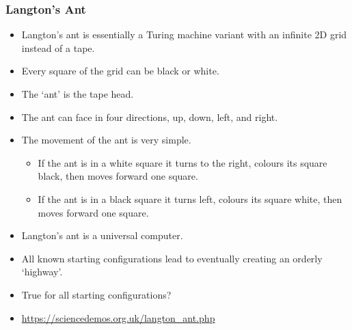 \documentclass[handout]{beamer}
\begin{document}
\begin{frame}
\frametitle{Langton's Ant}
\begin{itemize}
\item Langton's ant is essentially a Turing machine variant with an infinite 2D grid instead of a tape. 
\item Every square of the grid can be black or white. 
\item The `ant' is the tape head. 
\item The ant can face in four directions, up, down, left, and right. 
\item The movement of the ant is very simple. 
\begin{itemize}
\item If the ant is in a white square it turns to the right, colours its square black, then moves forward one square. 
\item If the ant is in a black square it turns left, colours its square white, then moves forward one square.
\end{itemize} 
\item Langton's ant is a universal computer.
\item All known starting configurations lead to eventually creating an orderly `highway'. 
\item True for all starting configurations?
\item \url{https://sciencedemos.org.uk/langton_ant.php} 
\end{itemize}
\end{frame}
\end{document}
